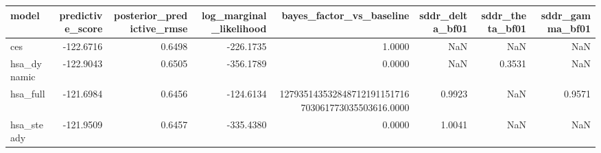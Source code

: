 \begin{tabular}{lrrrrrrr}
\toprule
model & predictive\_score & posterior\_predictive\_rmse & log\_marginal\_likelihood & bayes\_factor\_vs\_baseline & sddr\_delta\_bf01 & sddr\_theta\_bf01 & sddr\_gamma\_bf01 \\
\midrule
ces & -122.6716 & 0.6498 & -226.1735 & 1.0000 & NaN & NaN & NaN \\
hsa\_dynamic & -122.9043 & 0.6505 & -356.1789 & 0.0000 & NaN & 0.3531 & NaN \\
hsa\_full & -121.6984 & 0.6456 & -124.6134 & 127935143532848712191151716703061773035503616.0000 & 0.9923 & NaN & 0.9571 \\
hsa\_steady & -121.9509 & 0.6457 & -335.4380 & 0.0000 & 1.0041 & NaN & NaN \\
\bottomrule
\end{tabular}
